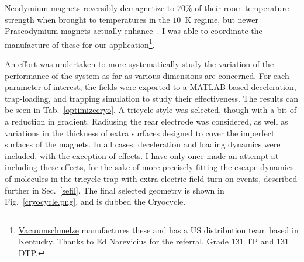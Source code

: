 Neodymium magnets reversibly demagnetize to $70\%$ of their room temperature strength when brought to temperatures in the $10$~K regime, but newer Praseodymium magnets actually enhance~\cite{Shea2010}.
I was able to coordinate the manufacture of these for our application\footnote{\href{https://www.vacuumschmelze.com}{Vacuumschmelze} manufactures these and has a US distribution team based in Kentucky. Thanks to Ed Narevicius for the referral. Grade 131 TP and 131 DTP.}.

An effort was undertaken to more systematically study the variation of the performance of the system as far as various dimensions are concerned.
For each parameter of interest, the fields were exported to a MATLAB based deceleration, trap-loading, and trapping simulation to study their effectiveness.
The results can be seen in Tab.~\ref{optimizecryo}.
A tricycle style was selected, though with a bit of a reduction in gradient.
Radiusing the rear electrode was considered, as well as variations in the thickness of extra surfaces designed to cover the imperfect surfaces of the magnets.
In all cases, deceleration and loading dynamics were included, with the exception of  effects.
I have only once made an attempt at including these effects, for the sake of more precisely fitting the escape dynamics of molecules in the tricycle trap with extra electric field turn-on events, described further in Sec.~\ref{sefil}.
The final selected geometry is shown in Fig.~\ref{cryocycle.png}, and is dubbed the Cryocycle.

